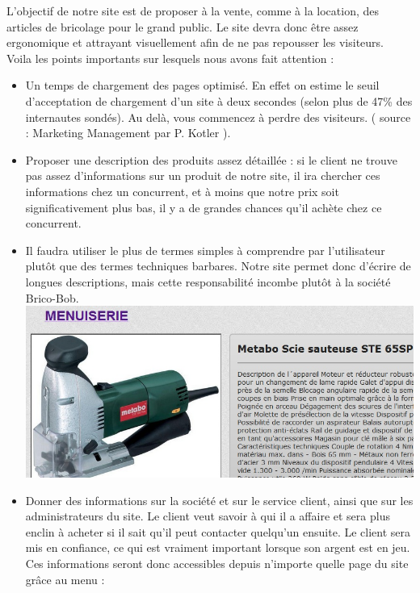 L'objectif de notre site est de proposer à la vente, comme à la location, des articles de bricolage pour le grand public.
Le site devra donc être assez ergonomique et attrayant visuellement afin de ne pas repousser les visiteurs.\\
		
Voila les points importants sur lesquels nous avons fait attention :

\begin{itemize}
\item Un temps de chargement des pages optimisé. 
En effet on estime le seuil d'acceptation de chargement d'un site à deux secondes (selon plus de 47\%  des internautes sondés).
Au delà, vous commencez à perdre des visiteurs. ( source : Marketing Management par P. Kotler ).\\

\item Proposer une description des produits assez détaillée : si le client ne trouve pas assez d'informations sur un produit de notre site, il ira chercher ces informations chez un concurrent, et à moins que notre prix soit significativement plus bas, il y a de grandes chances qu'il achète chez ce concurrent.\\
	
\item Il faudra utiliser le plus de termes simples à comprendre par l'utilisateur plutôt que des termes techniques barbares.
Notre site permet donc d'écrire de longues descriptions, mais cette responsabilité incombe plutôt à la société Brico-Bob.\\

\includegraphics[scale=0.5]{Images/demofichepro.jpg}\\

\item Donner des informations sur la société et sur le service client, ainsi que sur les administrateurs du site.
Le client veut savoir à qui il a affaire et sera plus enclin à acheter si il sait qu'il peut contacter quelqu'un ensuite.
Le client sera mis en confiance, ce qui est vraiment important lorsque son argent est en jeu.\\
Ces informations seront donc accessibles depuis n'importe quelle page du site grâce au menu :\\


\end{itemize}
